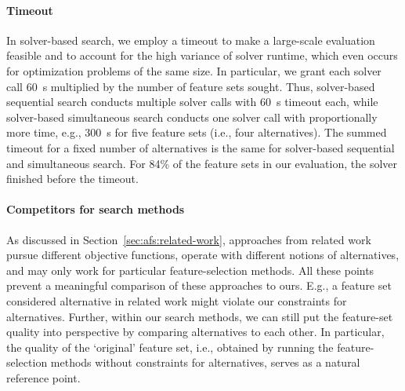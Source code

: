 \documentclass{article}
\theoremstyle{definition}
\begin{document}
\paragraph{Timeout}

In solver-based search, we employ a timeout to make a large-scale evaluation feasible and to account for the high variance of solver runtime, which even occurs for optimization problems of the same size.
In particular, we grant each solver call 60~s multiplied by the number of feature sets sought.
Thus, solver-based sequential search conducts multiple solver calls with 60~s timeout each, while solver-based simultaneous search conducts one solver call with proportionally more time, e.g., 300~s for five feature sets (i.e., four alternatives).
The summed timeout for a fixed number of alternatives is the same for solver-based sequential and simultaneous search.
For 84\% of the feature sets in our evaluation, the solver finished before the timeout.

\paragraph{Competitors for search methods}

As discussed in Section~\ref{sec:afs:related-work}, approaches from related work pursue different objective functions, operate with different notions of alternatives, and may only work for particular feature-selection methods.
All these points prevent a meaningful comparison of these approaches to ours.
E.g., a feature set considered alternative in related work might violate our constraints for alternatives.
Further, within our search methods, we can still put the feature-set quality into perspective by comparing alternatives to each other.
In particular, the quality of the `original' feature set, i.e., obtained by running the feature-selection methods without constraints for alternatives, serves as a natural reference point.
\end{document}
